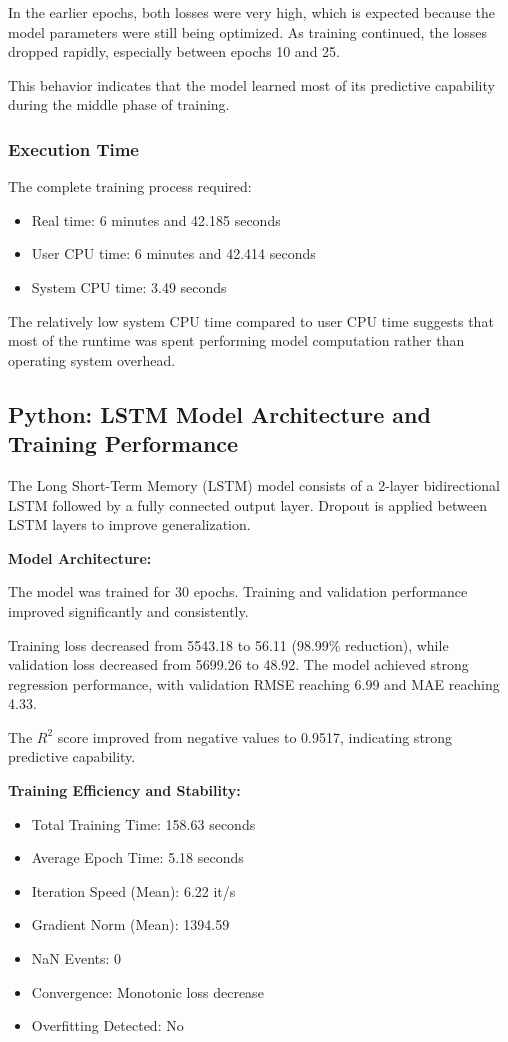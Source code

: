 \documentclass{ieeeaccess}
\begin{document}
In the earlier epochs, both losses were very high, which is expected because the model parameters were still being optimized. As training continued, the losses dropped rapidly, especially between epochs 10 and 25.

This behavior indicates that the model learned most of its predictive capability during the middle phase of training.

\subsubsection{Execution Time}

The complete training process required:

\begin{itemize}
    \item Real time: 6 minutes and 42.185 seconds
    \item User CPU time: 6 minutes and 42.414 seconds
    \item System CPU time: 3.49 seconds
\end{itemize}

The relatively low system CPU time compared to user CPU time suggests that most of the runtime was spent performing model computation rather than operating system overhead.
\subsection{Python: LSTM Model Architecture and Training Performance}

The Long Short-Term Memory (LSTM) model consists of a 2-layer bidirectional LSTM followed by a fully connected output layer. Dropout is applied between LSTM layers to improve generalization.

\textbf{Model Architecture:}


The model was trained for 30 epochs. Training and validation performance improved significantly and consistently.

Training loss decreased from 5543.18 to 56.11 (98.99\% reduction), while validation loss decreased from 5699.26 to 48.92. 
The model achieved strong regression performance, with validation RMSE reaching 6.99 and MAE reaching 4.33.

The $R^2$ score improved from negative values to 0.9517, indicating strong predictive capability.



\textbf{Training Efficiency and Stability:}
\begin{itemize}
    \item Total Training Time: 158.63 seconds
    \item Average Epoch Time: 5.18 seconds
    \item Iteration Speed (Mean): 6.22 it/s
    \item Gradient Norm (Mean): 1394.59
    \item NaN Events: 0
    \item Convergence: Monotonic loss decrease
    \item Overfitting Detected: No
\end{itemize}
\end{document}
